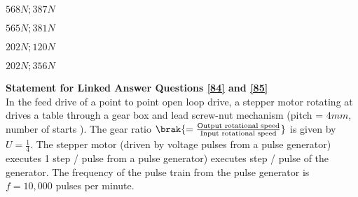 \begin{enumerate}
    \begin{multicols}{2}
        \item $568N;387N$
        \item $565N;381N$
        \item $202N;120N$
        \item $202N;356N$
    \end{multicols}
\end{enumerate}
\textbf{Statement for Linked Answer Questions \ref{84} and \ref{85}} \\
In the feed drive of a point to point open loop 
 drive, a stepper motor rotating at 
 drives a table through a gear box and lead screw-nut mechanism (pitch = $4mm$, number of starts 
). The gear ratio $\brak{= \frac{\text{Output rotational speed}}{\text{Input rotational speed}}}$ is given by $U = \frac{1}{4}$.
 The stepper motor (driven by voltage pulses from a pulse generator) executes 1
 step / pulse from a pulse generator) executes 
 step / pulse of the generator. The frequency of the pulse train from the pulse generator is $f = 10,000$ pulses per minute. \\
